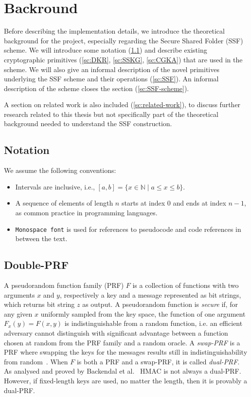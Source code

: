 \chapter{Backround}\label{ch:background}

Before describing the implementation details, we introduce the theoretical
background for the project, especially regarding the Secure Shared Folder 
(SSF) scheme. We will introduce some notation (\cref{sc:notation}) and
describe existing cryptographic primitives (\cref{sc:DKR}, \cref{sc:SSKG}, \cref{sc:CGKA})
that are used in the scheme.
We will also give an informal description of the novel primitives 
underlying the SSF scheme and their operations (\cref{sc:SSF}).
An informal description of the scheme closes the section (\cref{sc:SSF-scheme}).

A section on related work is also included (\cref{sc:related-work}),
to discuss further research related to this thesis but not specifically 
part of the theoretical background needed to understand the SSF construction.

\section{Notation}\label{sc:notation}

We assume the following conventions:
\begin{itemize}
    \item Intervals are inclusive, i.e., $[a, b] = \{x \in \mathbb{N} \mid a \leq x \leq b\}$.
    \item A sequence of elements of length $n$ starts at index $0$ and ends at index $n-1$, as common practice in programming languages.
    \item \texttt{Monospace font} is used for references to pseudocode and code references in between the text.
\end{itemize}

\section{Double-PRF}\label{sc:DPRF}

A pseudorandom function family (PRF) $F$ is a collection of functions
with two arguments $x$ and $y$, respectively a key and a message
represented as bit strings, which returns bit string $z$ as output.
A pseudorandom function is \textit{secure} if, for any given $x$
uniformly sampled from the key space, the function of one argument
$F_x(y) = F(x, y)$ is indistinguishable from a random function, i.e.
an efficient adversary cannot distinguish with significant advantage
between a function chosen at random from the PRF family and a random oracle.
A \textit{swap-PRF} is a PRF where swapping the keys for the messages
results still in indistinguishability from random~\cite{EPRINT:BelLys15}.
When $F$ is both a PRF and a swap-PRF, it is called \textit{dual-PRF}.
As analysed and proved by Backendal et al.~\cite{C:BBGS23} HMAC is not always a
dual-PRF. However, if fixed-length keys are used, no matter the length,
then it is provably a dual-PRF.

